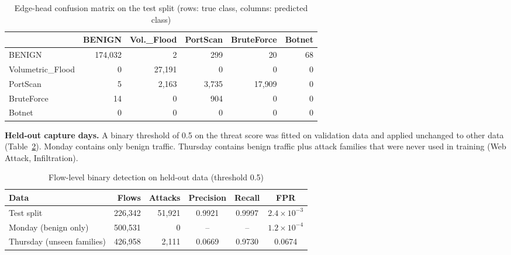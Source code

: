 \documentclass[12pt,a4paper]{report}
\begin{document}
\begin{table}[htbp]
\caption{Edge-head confusion matrix on the test split (rows: true class, columns: predicted class)}
\label{tab:ml_confusion}
\centering
\begin{tabular}{|l|r|r|r|r|r|}
\hline
 & \textbf{BENIGN} & \textbf{Vol.\_Flood} & \textbf{PortScan} & \textbf{BruteForce} & \textbf{Botnet} \\
\hline
BENIGN & 174{,}032 & 2 & 299 & 20 & 68 \\
Volumetric\_Flood & 0 & 27{,}191 & 0 & 0 & 0 \\
PortScan & 5 & 2{,}163 & 3{,}735 & 17{,}909 & 0 \\
BruteForce & 14 & 0 & 904 & 0 & 0 \\
Botnet & 0 & 0 & 0 & 0 & 0 \\
\hline
\end{tabular}
\end{table}

\par\textbf{Held-out capture days.} A binary threshold of 0.5 on the threat score was fitted on validation data and applied unchanged to other data (Table~\ref{tab:ml_heldout}). Monday contains only benign traffic. Thursday contains benign traffic plus attack families that were never used in training (Web Attack, Infiltration).

\begin{table}[htbp]
\caption{Flow-level binary detection on held-out data (threshold 0.5)}
\label{tab:ml_heldout}
\centering
\begin{tabular}{|l|r|r|c|c|c|}
\hline
\textbf{Data} & \textbf{Flows} & \textbf{Attacks} & \textbf{Precision} & \textbf{Recall} & \textbf{FPR} \\
\hline
Test split & 226{,}342 & 51{,}921 & 0.9921 & 0.9997 & $2.4\times10^{-3}$ \\
Monday (benign only) & 500{,}531 & 0 & -- & -- & $1.2\times10^{-4}$ \\
Thursday (unseen families) & 426{,}958 & 2{,}111 & 0.0669 & 0.9730 & 0.0674 \\
\hline
\end{tabular}
\end{table}
\end{document}
